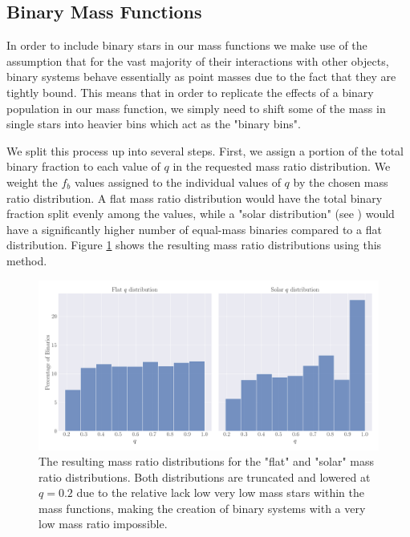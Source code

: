 \subsection{Binary Mass Functions}

In order to include binary stars in our mass functions we make use of the assumption that for the
vast majority of their interactions with other objects, binary systems behave essentially as point
masses due to the fact that they are tightly bound. This means that in order to replicate the
effects of a binary population in our mass function, we simply need to shift some of the mass in
single stars into heavier bins which act as the "binary bins".


We split this process up into several steps. First, we assign a portion of the total binary fraction
to each value of $q$ in the requested mass ratio distribution. We weight the $f_b$ values assigned
to the individual values of $q$ by the chosen mass ratio distribution. A flat mass ratio
distribution would have the total binary fraction split evenly among the values, while a "solar
distribution" (see \citealt{Reggiani2013}) would have a significantly higher number of equal-mass
binaries compared to a flat distribution. Figure \ref{fig:2/q-dists} shows the resulting mass ratio
distributions using this method.





\begin{figure}
    \centering
    \includegraphics[width=\textwidth]{figures/q-dists.png}
    \caption{The resulting mass ratio distributions for the "flat" and "solar" mass ratio
        distributions. Both distributions are truncated and lowered at $q=0.2$ due to the relative
        lack low very low mass stars within the mass functions, making the creation of binary
        systems with a very low mass ratio impossible.}
    \label{fig:2/q-dists}
\end{figure}


